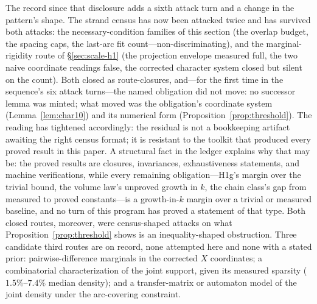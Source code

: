 \documentclass[11pt,a4paper]{article}
\numberwithin{equation}{section}
\theoremstyle{plain}
\theoremstyle{definition}
\theoremstyle{remark}
\begin{document}
The record since that disclosure adds a sixth attack turn and a change
in the pattern's shape. The strand census has now been attacked twice
and has survived both attacks: the necessary-condition families of
this section (the overlap budget, the spacing caps, the last-arc fit
count---non-discriminating), and the marginal-rigidity route of
\S\ref{sec:scale-h1} (the projection envelope measured full, the two
naive coordinate readings false, the corrected character system closed
but silent on the count). Both closed as route-closures, and---for the
first time in the sequence's six attack turns---the named obligation
did not move: no successor lemma was minted; what moved was the
obligation's coordinate system (Lemma~\ref{lem:char10}) and its
numerical form (Proposition~\ref{prop:threshold}). The reading
has tightened accordingly: the residual is not a bookkeeping artifact
awaiting the right census format; it is resistant to the toolkit that
produced every proved result in this paper. A structural fact in the
ledger explains why that may be: the proved results are closures,
invariances, exhaustiveness statements, and machine verifications,
while every remaining obligation---H1g's margin over the trivial
bound, the volume law's unproved growth in $k$, the chain class's gap
from measured to proved constants---is a growth-in-$k$ margin over a
trivial or measured baseline, and no turn of this program has proved a
statement of that type. Both closed routes, moreover, were
census-shaped attacks on what Proposition~\ref{prop:threshold} shows
is an inequality-shaped obstruction. Three candidate third routes are
on record, none attempted here and none with a stated prior:
pairwise-difference marginals in the corrected $X$ coordinates; a
combinatorial characterization of the joint support, given its
measured sparsity ($1.5\%$--$7.4\%$ median density); and a
transfer-matrix or automaton model of the joint density under the
arc-covering constraint.
\end{document}
